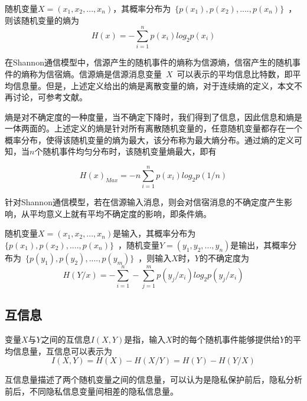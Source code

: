 \begin{definition}
随机变量$X=(x_1,x_2,...,x_n)$，其概率分布为~$\{p(x_1),p(x_2),....,p(x_n)\}$~，则该随机变量的熵为
\begin{equation}
H(x)=-\sum_{i=1}^{n}p(x_i)log_2p(x_i)
\end{equation}
\end{definition}
在Shannon通信模型中，信源产生的随机事件的熵称为信源熵，信宿产生的随机事件的熵称为信宿熵。信源熵是信源消息变量~$X$~可以表示的平均信息比特数，即平均信息量。但是，上述定义给出的熵是离散变量的熵，对于连续熵的定义，本文不再讨论，可参考文献\cite{stone2018information}。

熵是对不确定度的一种度量，当不确定下降时，我们得到了信息，因此信息和熵是一体两面的。上述定义的熵是针对所有离散随机变量的，任意随机变量都存在一个概率分布，使得该随机变量的熵为最大，该分布称为最大熵分布。通过熵的定义可知，当$n$个随机事件均匀分布时，该随机变量熵最大，即有

\begin{equation}
H(x)_{Max}=-n\sum_{i=1}^{n}p(x_i)log_2p(1/n)
\end{equation}


针对Shannon通信模型，若在信源输入消息，则会对信宿消息的不确定度产生影响，从平均意义上就有平均不确定度的影响，即条件熵。

\begin{definition}
	随机变量$X=(x_1,x_2,...,x_n)$是输入，其概率分布为~$\{p(x_1),p(x_2),....,p(x_n)\}$~，随机变量$Y=(y_1,y_2,...,y_n)$是输出，其概率分布为~$\{p(y_1),p(y_2),....,p(y_m)\}$~，则输入$X$时，$Y$的不确定度为
	\begin{equation}
	H(Y/x)=-\sum_{i=1}^{n}-\sum_{j=1}^{m}p(y_j/x_i)log_2p(y_j/x_i)
	\end{equation}
\end{definition}


\subsection{互信息}

\begin{definition}
变量$X$与$Y$之间的互信息$I(X,Y)$是指，输入$X$时的每个随机事件能够提供给$Y$的平均信息量，互信息可以表示为
\begin{equation}
I(X,Y)=H(X)-H(X/Y)=H(Y)-H(Y/X)
\end{equation}
\end{definition}

互信息量描述了两个随机变量之间的信息量，可以认为是隐私保护前后，隐私分析前后，不同隐私信息变量间相差的隐私信息量。



